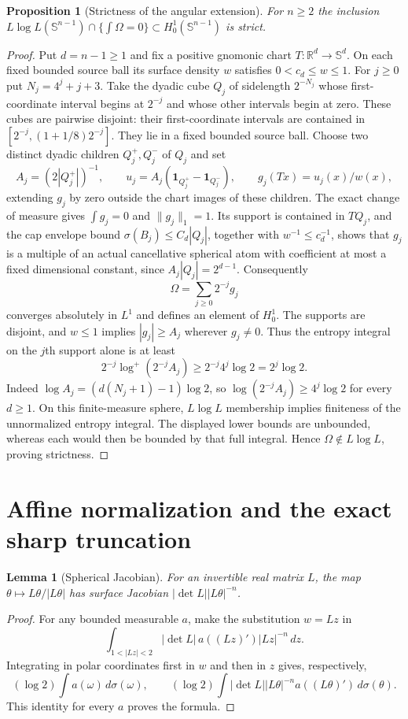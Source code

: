 \documentclass[11pt]{article}
\numberwithin{equation}{section}
\newtheorem{proposition}[theorem]{Proposition}
\newtheorem{lemma}[theorem]{Lemma}
\theoremstyle{remark}
\theoremstyle{definition}
\begin{document}
\begin{proposition}[Strictness of the angular extension]\label{mod:atom:prop:strict-H1}
For $n\ge2$ the inclusion
$L\log L(\mathbb S^{n-1})\cap\{\int\Omega=0\}\subset H^1_0(\mathbb S^{n-1})$
is strict.
\end{proposition}
\begin{proof}
Put $d=n-1\ge1$ and fix a positive gnomonic chart
$T:\mathbb R^d\to\mathbb S^d$.  On each fixed bounded source ball its
surface density $w$ satisfies $0<c_d\le w\le1$.
For $j\ge0$ put $N_j=4^j+j+3$.  Take the dyadic cube $Q_j$ of
sidelength $2^{-N_j}$ whose first-coordinate interval begins at
$2^{-j}$ and whose other intervals begin at zero.  These cubes are
pairwise disjoint: their first-coordinate intervals are contained in
$[2^{-j},(1+1/8)2^{-j}]$.  They lie in a fixed bounded source ball.
Choose two distinct dyadic children $Q_j^+,Q_j^-$ of $Q_j$ and set
\[
 A_j=(2|Q_j^+|)^{-1},\qquad
 u_j=A_j(\mathbf1_{Q_j^+}-\mathbf1_{Q_j^-}),\qquad
 g_j(Tx)=u_j(x)/w(x),
\]
extending $g_j$ by zero outside the chart images of these children.
The exact change of measure gives $\int g_j=0$ and $\|g_j\|_1=1$.
Its support is contained in $TQ_j$, and the cap envelope bound
$\sigma(B_j)\le C_d|Q_j|$, together with $w^{-1}\le c_d^{-1}$,
shows that $g_j$ is a multiple of an actual cancellative spherical atom
with coefficient at most a fixed dimensional constant, since
$A_j|Q_j|=2^{d-1}$.
Consequently
\[
 \Omega=\sum_{j\ge0}2^{-j}g_j
\]
converges absolutely in $L^1$ and defines an element of $H^1_0$.
The supports are disjoint, and $w\le1$ implies
$|g_j|\ge A_j$ wherever $g_j\ne0$.  Thus the entropy integral on the
$j$th support alone is at least
\[
 2^{-j}\log^+(2^{-j}A_j)
 \ge 2^{-j}4^j\log2=2^j\log2.
\]
Indeed $\log A_j=(d(N_j+1)-1)\log2$, so
$\log(2^{-j}A_j)\ge4^j\log2$ for every $d\ge1$.
On this finite-measure sphere, $L\log L$ membership implies finiteness
of the unnormalized entropy integral.  The displayed lower bounds are
unbounded, whereas each would then be bounded by that full integral.
Hence $\Omega\notin L\log L$, proving strictness.
\end{proof}



\section{Affine normalization and the exact sharp truncation}\label{mod:atom:sec:affine}
\begin{lemma}[Spherical Jacobian]\label{mod:atom:lem:jacobian}
For an invertible real matrix $L$, the map
$\theta\mapsto L\theta/|L\theta|$ has surface Jacobian
$|\det L||L\theta|^{-n}$.
\end{lemma}
\begin{proof}
For any bounded measurable $a$, make the substitution $w=Lz$ in
\[
 \int_{1<|Lz|<2}|\det L|\,a((Lz)')|Lz|^{-n}\,dz.
\]
Integrating in polar coordinates first in $w$ and then in $z$ gives,
respectively,
\[
 (\log2)\int a(\omega)\,d\sigma(\omega),\qquad
 (\log2)\int |\det L||L\theta|^{-n}a((L\theta)')\,d\sigma(\theta).
\]
This identity for every $a$ proves the formula.
\end{proof}
\end{document}
